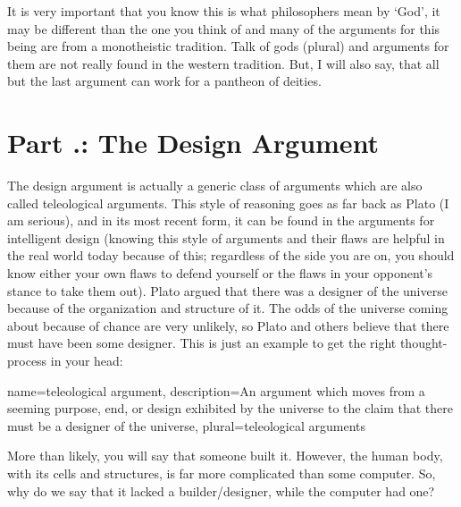 It is very important that you know this is what philosophers mean by `God', it may be different than the one you think of and many of the arguments for this being are from a monotheistic tradition. Talk of gods (plural) and arguments for them are not really found in the western tradition. But, I will also say, that all but the last argument can work for a pantheon of deities. 

\section{Part \thechapcount.\theseccount: The Design Argument}

The design argument is actually a generic class of arguments which are also called \glspl{teleological argument}. This style of reasoning goes as far back as Plato (I am serious), and in its most recent form, it can be found in the arguments for intelligent design (knowing this style of arguments and their flaws are helpful in the real world today because of this; regardless of the side you are on, you should know either your own flaws to defend yourself or the flaws in your opponent's stance to take them out). Plato argued that there was a designer of the universe because of the organization and structure of it. The odds of the universe coming about because of chance are very unlikely, so Plato and others believe that there must have been some designer. This is just an example to get the right thought-process in your head:

{
name=teleological argument,
description={An argument which moves from a seeming purpose, end, or design exhibited by the universe to the claim that there must be a designer of the universe},
plural=teleological arguments
}



More than likely, you will say that someone built it. However, the human body, with its cells and structures, is far more complicated than some computer. So, why do we say that it lacked a builder/designer, while the computer had one? 
